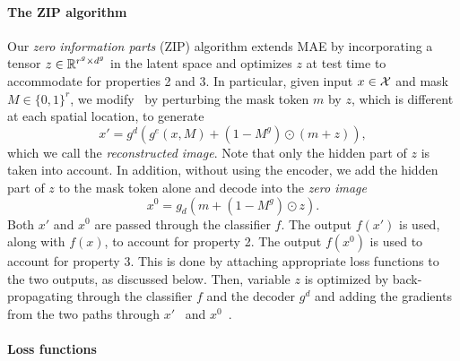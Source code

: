 
\paragraph{The ZIP algorithm}

Our \emph{zero information parts} (ZIP) algorithm extends MAE by incorporating a tensor $z \in \mathbb{R}^{r^g \times d^g}$ in the latent space and optimizes $z$ at test time to accommodate for properties 2 and 3. In particular, given input $x \in \mathcal{X}$ and mask $M \in \{0,1\}^r$, we modify~ by perturbing the mask token $m$ by $z$, which is different at each spatial location, to generate
\begin{equation}
	x' = g^d(g^e(x, M) + (1-M^g) \odot (m + z)),
\label{eq:rec}
\end{equation}
which we call the \emph{reconstructed image}. Note that only the hidden part of $z$ is taken into account. In addition, without using the encoder, we add the hidden part of $z$ to the mask token alone and decode into the \emph{zero image}
\begin{equation}
	x^0 = g_d(m + (1-M^g) \odot z).
\label{eq:zero}
\end{equation}
Both $x'$ and $x^0$ are passed through the classifier $f$. The output $f(x')$ is used, along with $f(x)$, to account for property 2. The output $f(x^0)$ is used to account for property 3. This is done by attaching appropriate loss functions to the two outputs, as discussed below. Then, variable $z$ is optimized by back-propagating through the classifier $f$ and the decoder $g^d$ and adding the gradients from the two paths through $x'$~ and $x^0$~.


\paragraph{Loss functions}


